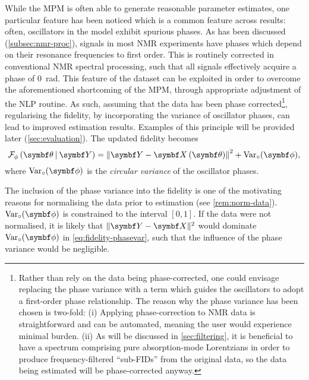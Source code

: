 While the \ac{MPM} is often able to generate reasonable parameter estimates,
one particular feature has been noticed which is a common feature across
results: often, oscillators in the model exhibit spurious
phases. As has been discussed (\cref{subsec:nmr-proc}),
signals in most \ac{NMR} experiments have phases which depend on their
resonance frequencies to first order. This is routinely corrected in
conventional \ac{NMR} spectral processing, such that all signals effectively
acquire a phase of \qty{0}{\radian}. This feature of the dataset can be
exploited in order to overcome the aforementioned shortcoming of the \ac{MPM},
through appropriate adjustment of the \ac{NLP} routine. As such, assuming that
the data has been phase corrected\footnote{
    Rather than rely on the data being phase-corrected, one could envisage
    replacing the phase variance with a term which guides the
    oscillators to adopt a first-order phase relationship. The reason why the
    phase variance has been chosen is two-fold: (i) Applying phase-correction
    to \ac{NMR} data is straightforward and can be automated,
    meaning the user would experience minimal burden. (ii) As will be discussed
    in \cref{sec:filtering}, it is beneficial to have a spectrum comprising
    pure absorption-mode Lorentzians in order to produce frequency-filtered
    ``sub-\acp{FID}'' from the original data, so the data being estimated will
    be phase-corrected anyway.
}, regularising the fidelity, by incorporating the variance of oscillator
phases, can lead to improved estimation results. Examples of
this principle will be provided later (\cref{sec:evaluation}).
The updated fidelity becomes
\begin{equation}
    \FphithY = \left \lVert \bY - \bXth \right \rVert^2 + \circvar,
    \label{eq:fidelity-phasevar}
\end{equation}
where $\circvar$ is the \emph{circular variance} of the oscillator phases.
\begin{remark}
    The inclusion of the phase variance into the fidelity is one of the
    motivating reasons for normalising the data prior to estimation (see
    \cref{rem:norm-data}). $\circvar$ is constrained to the interval $[0, 1]$.
    If the data were not normalised, it is likely that $\lVert \bY - \bX
    \rVert^2$ would dominate $\circvar$ in \cref{eq:fidelity-phasevar},
    such that the influence of the phase variance would be negligible.
\end{remark}

